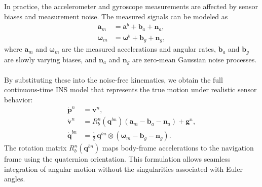 In practice, the accelerometer and gyroscope measurements are affected by sensor biases and measurement noise. The measured signals can be modeled as
$$
\begin{aligned}
    \mathbf{a}_m &= \mathbf{a}^b + \mathbf{b}_a + \mathbf{n}_a, \\
    \boldsymbol{\omega}_m &= \boldsymbol{\omega}^b + \mathbf{b}_g + \mathbf{n}_g,
\end{aligned}
$$
where $\mathbf{a}_m$ and $\boldsymbol{\omega}_m$ are the measured accelerations and angular rates, $\mathbf{b}_a$ and $\mathbf{b}_g$ are slowly varying biases, and $\mathbf{n}_a$ and $\mathbf{n}_g$ are zero-mean Gaussian noise processes.  
\\ \\
By substituting these into the noise-free kinematics, we obtain the full continuous-time INS model that represents the true motion under realistic sensor behavior:
$$
\begin{aligned}
    \dot{\mathbf{p}}^n &= \mathbf{v}^n, \\
    \dot{\mathbf{v}}^n &= R_b^n(\mathbf{q}^{bn})(\mathbf{a}_m - \mathbf{b}_a - \mathbf{n}_a) + \mathbf{g}^n, \\
    \dot{\mathbf{q}}^{bn} &= \tfrac{1}{2}\,\mathbf{q}^{bn} \otimes (\boldsymbol{\omega}_m - \mathbf{b}_g - \mathbf{n}_g).
\end{aligned}
$$
The rotation matrix $R_b^n(\mathbf{q}^{bn})$ maps body-frame accelerations to the navigation frame using the quaternion orientation. This formulation allows seamless integration of angular motion without the singularities associated with Euler angles.  









